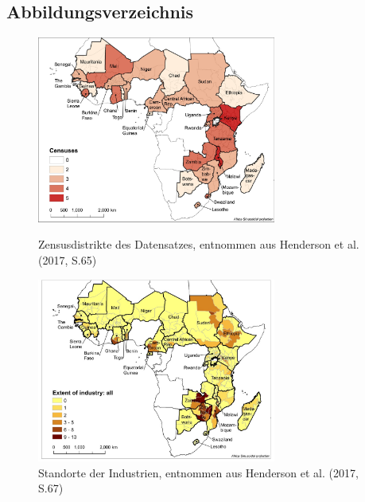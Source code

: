 \hypertarget{lof}{%
\subsection*{Abbildungsverzeichnis}\label{lof}}


\begin{figure}[H]
{\centering \includegraphics[width=0.7\textwidth]{../../images/2022-06-28_10-00-00.jpg}

}

\caption{Zensusdistrikte des Datensatzes, entnommen aus Henderson et al. (2017, S.65)}

\label{fig1}
{\centering \includegraphics[width=0.7\textwidth]{../../images/2022-06-28_10-00-01.jpg}

}
\label{fig2}

\caption{Standorte der Industrien, entnommen aus Henderson et al. (2017, S.67)}

\end{figure}

\newpage
{}

